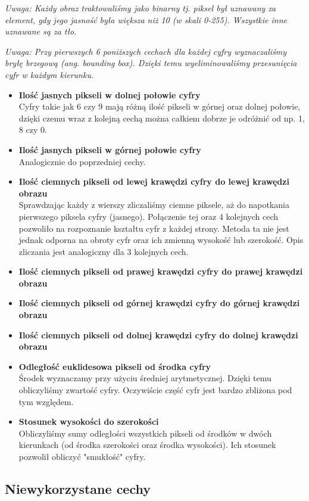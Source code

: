 \documentclass{classrep}
\begin{document}
\textsl{Uwaga: Każdy obraz traktowaliśmy jako binarny tj. piksel był uznawany za element, gdy jego jasność była większa niż 10 (w skali 0-255). Wszystkie inne uznawane są za tło.}

\textsl{Uwaga: Przy pierwszych 6 poniższych cechach dla każdej cyfry wyznaczaliśmy bryłę brzegową (ang. bounding box). Dzięki temu wyeliminowaliśmy przesunięcia cyfr w każdym kierunku.}

\begin{itemize}
\item \textbf{Ilość jasnych pikseli w dolnej połowie cyfry}\\
 Cyfry takie jak 6 czy 9 mają  różną ilość pikseli w górnej oraz dolnej połowie, dzięki czemu wraz z kolejną cechą można całkiem dobrze je odróżnić od np. 1, 8 czy 0.
\item \textbf{Ilość jasnych pikseli w górnej połowie cyfry}\\
 Analogicznie do poprzedniej cechy.
\item \textbf{Ilość ciemnych pikseli od lewej krawędzi cyfry do lewej krawędzi obrazu}\\
Sprawdzając każdy z wierszy zliczaliśmy ciemne piksele, aż do napotkania pierwszego piksela cyfry (jasnego). Połączenie tej oraz 4 kolejnych cech pozwoliło na rozpoznanie kształtu cyfr z każdej strony. Metoda ta nie jest jednak odporna na obroty cyfr oraz ich zmienną wysokość lub szerokość. Opis zliczania jest analogiczny dla 3 kolejnych cech.
\item \textbf{Ilość ciemnych pikseli od prawej krawędzi cyfry do prawej krawędzi obrazu}
\item \textbf{Ilość ciemnych pikseli od górnej krawędzi cyfry do górnej krawędzi obrazu}
\item \textbf{Ilość ciemnych pikseli od dolnej krawędzi cyfry do dolnej krawędzi obrazu}
\item \textbf{Odległość euklidesowa pikseli od środka cyfry}\\
 Środek wyznaczamy przy użyciu średniej arytmetycznej. Dzięki temu obliczyliśmy zwartość cyfry. Oczywiście część cyfr jest bardzo zbliżona pod tym względem.
\item \textbf{Stosunek wysokości do szerokości}\\
 Obliczyliśmy sumy odległości wszystkich pikseli od środków w dwóch kierunkach (od środka szerokości oraz środka wysokości). Ich stosunek pozwolił obliczyć "smukłość" cyfry. 
\end{itemize}

\subsection{Niewykorzystane cechy}
\end{document}
